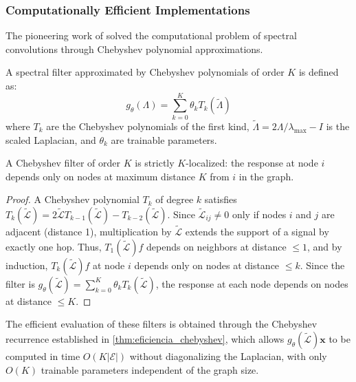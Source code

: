 \subsubsection{Computationally Efficient Implementations}

The pioneering work of \citet{defferrard2017convolutionalneuralnetworksgraphs} solved the computational problem of spectral convolutions through Chebyshev polynomial approximations.

\begin{definition}\label{def:chebnet}
A spectral filter approximated by Chebyshev polynomials of order $K$ is defined as:
\[
g_\theta(\Lambda) = \sum_{k=0}^{K} \theta_k T_k(\tilde{\Lambda})
\]
where $T_k$ are the Chebyshev polynomials of the first kind, $\tilde{\Lambda} = 2\Lambda/\lambda_{\max} - I$ is the scaled Laplacian, and $\theta_k$ are trainable parameters.
\end{definition}

\begin{theorem}\label{thm:localizacion_chebyshev}
A Chebyshev filter of order $K$ is strictly $K$-localized: the response at node $i$ depends only on nodes at maximum distance $K$ from $i$ in the graph.
\end{theorem}

\begin{proof}
A Chebyshev polynomial $T_k$ of degree $k$ satisfies $T_k(\tilde{\mathcal{L}}) = 2\tilde{\mathcal{L}} T_{k-1}(\tilde{\mathcal{L}}) - T_{k-2}(\tilde{\mathcal{L}})$. Since $\tilde{\mathcal{L}}_{ij} \neq 0$ only if nodes $i$ and $j$ are adjacent (distance 1), multiplication by $\tilde{\mathcal{L}}$ extends the support of a signal by exactly one hop. Thus, $T_1(\tilde{\mathcal{L}})f$ depends on neighbors at distance $\leq 1$, and by induction, $T_k(\tilde{\mathcal{L}})f$ at node $i$ depends only on nodes at distance $\leq k$. Since the filter is $g_\theta(\tilde{\mathcal{L}}) = \sum_{k=0}^K \theta_k T_k(\tilde{\mathcal{L}})$, the response at each node depends on nodes at distance $\leq K$.
\end{proof}

The efficient evaluation of these filters is obtained through the Chebyshev recurrence established in \autoref{thm:eficiencia_chebyshev}, which allows $g_\theta(\tilde{\mathcal{L}}) \mathbf{x}$ to be computed in time $O(K|\mathcal{E}|)$ without diagonalizing the Laplacian, with only $O(K)$ trainable parameters independent of the graph size.

